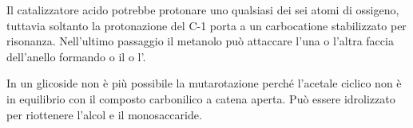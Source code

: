 Il catalizzatore acido potrebbe protonare uno qualsiasi dei sei atomi di ossigeno, tuttavia soltanto la protonazione del C-1 porta a un carbocatione stabilizzato per risonanza. Nell'ultimo passaggio il metanolo può attaccare l'una o l'altra faccia dell'anello formando o il  o l'.

In un glicoside non è più possibile la mutarotazione perché l'acetale  ciclico non è in equilibrio con il composto carbonilico a catena aperta. Può essere idrolizzato per riottenere l'alcol e il monosaccaride.


